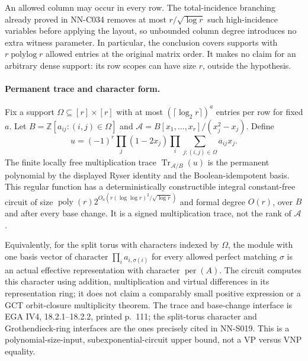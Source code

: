 An allowed column may occur in every row.  The total-incidence
branching already proved in NN-C034 removes at most
$r/\sqrt{\log r}$ such high-incidence variables before applying
the layout, so unbounded column degree introduces no extra witness
parameter.  In particular, the conclusion covers supports with
$r\operatorname{polylog} r$ allowed entries at the original matrix
order.  It makes no claim for an arbitrary dense support: its
row scopes can have size $r$, outside the hypothesis.

\paragraph{Permanent trace and character form.}
Fix a support $\Omega\subseteq[r]\times[r]$ with at most
$(\lceil\log_2r\rceil)^a$ entries per row for fixed $a$.
Let $B=\mathbb Z[a_{ij}:(i,j)\in\Omega]$ and
$\mathscr A=B[x_1,\ldots,x_r]/(x_j^2-x_j)$.  Define
\[
 u=(-1)^r\prod_j(1-2x_j)
                 \prod_i\sum_{j:(i,j)\in\Omega}a_{ij}x_j.
\]
The finite locally free multiplication trace
$\operatorname{Tr}_{\mathscr A/B}(u)$ is the permanent polynomial
by the displayed Ryser identity and the Boolean-idempotent basis.
This regular function has a deterministically constructible integral
constant-free circuit of size
$\operatorname{poly}(r)2^{O_a(r(\log\log r)^2/\sqrt{\log r})}$
and formal degree $O(r)$, over $B$ and after every base change.
It is a signed multiplication trace,
not the rank of $\mathscr A$.

Equivalently, for the split torus with characters indexed by
$\Omega$, the module with one basis vector of character
$\prod_i a_{i,\sigma(i)}$ for every allowed perfect matching
$\sigma$ is an actual effective representation with character
$\operatorname{per}(A)$.  The circuit computes this character
using addition, multiplication and virtual differences in its representation ring;
it does not claim a comparably small positive expression or a
GCT orbit-closure multiplicity theorem.  The trace and base-change
interface is EGA IV4, 18.2.1--18.2.2, printed p.~111; the
split-torus character and Grothendieck-ring interfaces are the
ones precisely cited in NN-S019.  This is a polynomial-size-input,
subexponential-circuit upper bound, not a VP versus VNP equality.
